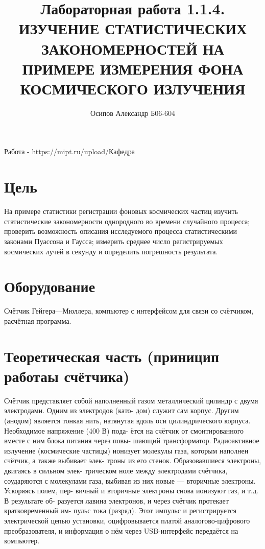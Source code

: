 \documentclass[12pt]{extarticle}
\begin{document}
\author{Осипов Александр Б06-604}
\title{Лабораторная работа 1.1.4. ИЗУЧЕНИЕ СТАТИСТИЧЕСКИХ ЗАКОНОМЕРНОСТЕЙ НА 
ПРИМЕРЕ ИЗМЕРЕНИЯ ФОНА КОСМИЧЕСКОГО ИЗЛУЧЕНИЯ}
\maketitle

Работа - https://mipt.ru/upload/Кафедра%

\section{Цель}

На примере статистики регистрации фоновых космических частиц изучить статистические закономерности однородного во времени случайного процесса;
проверить возможность описания исследуемого процесса статистическими законами
Пуассона и Гаусса; измерить среднее число регистрируемых космических лучей в секунду и определить погрешность результата.
\vspace{5mm}

\section{Оборудование}

Счётчик Гейгера—Мюллера, компьютер с интерфейсом для
связи со счётчиком, расчётная программа.
\vspace{5mm}

\section{Теоретическая часть (приницип работаы счётчика)}

Счётчик представляет собой наполненный газом
металлический цилиндр с двумя электродами. Одним из электродов (като-
дом) служит сам корпус. Другим (анодом) является тонкая нить, натянутая
вдоль оси цилиндрического корпуса. Необходимое напряжение (400 В) пода-
ётся на счётчик от смонтированного вместе с ним блока питания через повы-
шающий трансформатор. Радиоактивное излучение (космические частицы)
ионизует молекулы газа, которым наполнен счётчик, а также выбивает элек-
троны из его стенок. Образовавшиеся электроны, двигаясь в сильном элек-
трическом ноле между электродами счётчика, соударяются с молекулами
газа, выбивая из них новые — вторичные электроны. Ускоряясь полем, пер-
вичный и вторичные электроны снова ионизуют газ, и т.д. В результате об-
разуется лавина электронов, и через счётчик протекает кратковременный им-
пульс тока (разряд). Этот импульс и регистрируется электрической цепью
установки, оцифровывается платой аналогово-цифрового преобразователя, и
информация о нём через USB-интерфейс передаётся на компьютер.
\vspace{5mm}
\end{document}
